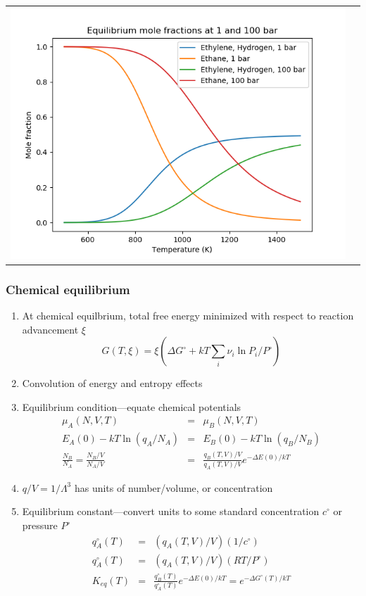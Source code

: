 \documentclass[11pt]{article}
\begin{document}
\begin{table}
\begin{tabular}{cc}
\includegraphics[scale=0.5]{./Images/equilibrium.png} 
\end{tabular}
\end{table}

\subsubsection{Chemical equilibrium}
\label{sec:org872b4b5}
\begin{enumerate}
\item At chemical equilbrium, total free energy minimized with respect to reaction advancement \(\xi\)
\[G(T,\xi) = \xi  (\Delta G^\circ + k T \sum_i \nu_i \ln P_i/P^\circ) \]
\item Convolution of energy and entropy effects
\item Equilibrium condition---equate chemical potentials
  \begin{eqnarray*}
 \mu_A(N,V,T) & = & \mu_B(N,V,T) \\
 E_A(0) - k T \ln (q_A/N_A) & = & E_B(0) - k T \ln (q_B/N_B) \\
\frac{N_B}{N_A} =  \frac{N_B/V}{N_A/V} & = &\frac{q_B(T,V)/V}{q_A(T,V)/V} e^{-\Delta E(0)/kT}
  \end{eqnarray*}
\item \(q/V = 1/\Lambda^3\) has units of number/volume, or concentration
\item Equilibrium constant---convert units to some standard concentration \(c^\circ\) or pressure \(P^\circ\)
 \begin{eqnarray*}
  q_A^\circ(T) & = & (q_A(T,V)/V) (1/c^\circ) \\
  q_A^\circ(T) & = & (q_A(T,V)/V)(RT/P^\circ) \\ 
K_{eq}(T) & = &\frac{q_B^\circ(T)}{q_A^\circ(T)} e^{-\Delta E(0)/kT} = e^{-\Delta G^\circ(T)/kT} 
 \end{eqnarray*}
\end{enumerate}
\end{document}
